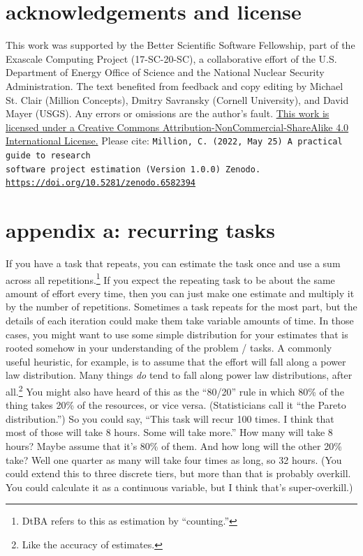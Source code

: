 \documentclass[12pt,oneside]{book}
\begin{document}
\chapter*{acknowledgements and license}
This work was supported by the Better Scientific Software Fellowship, part of the Exascale Computing Project (17-SC-20-SC), a collaborative effort of the U.S. Department of Energy Office of Science and the National Nuclear Security Administration. The text benefited from feedback and copy editing by Michael St. Clair (Million Concepts), Dmitry Savransky (Cornell University), and David Mayer (USGS). Any errors or omissions are the author's fault.
\hfill \break \hfill \break
\href{http://creativecommons.org/licenses/by-nc-sa/4.0/}{This work is licensed under a Creative Commons Attribution-NonCommercial-ShareAlike 4.0 International License.} Please cite:
\hfill \break \hfill \break
\texttt{Million, C. (2022, May 25) A practical guide to research \\software project estimation (Version 1.0.0) Zenodo. \\\url{https://doi.org/10.5281/zenodo.6582394}}

\chapter*{appendix a: recurring tasks}

If you have a task that repeats, you can estimate the task once and use a sum across all repetitions.\footnote{DtBA refers to this as estimation by ``counting.''} If you expect the repeating task to be about the same amount of effort every time, then you can just make one estimate and multiply it by the number of repetitions. Sometimes a task repeats for the most part, but the details of each iteration could make them take variable amounts of time. In those cases, you might want to use some simple distribution for your estimates that is rooted somehow in your understanding of the problem / tasks. A commonly useful heuristic, for example, is to assume that the effort will fall along a power law distribution. Many things \emph{do} tend to fall along power law distributions, after all.\footnote{Like the accuracy of estimates.} You might also have heard of this as the ``80/20'' rule in which 80\% of the thing takes 20\% of the resources, or vice versa. (Statisticians call it ``the Pareto distribution.'') So you could say, ``This task will recur 100 times. I think that most of those will take 8 hours. Some will take more.'' How many will take 8 hours? Maybe assume that it's 80\% of them. And how long will the other 20\% take? Well one quarter as many will take four times as long, so 32 hours. (You could extend this to three discrete tiers, but more than that is probably overkill. You could calculate it as a continuous variable, but I think that's super-overkill.)
\end{document}
